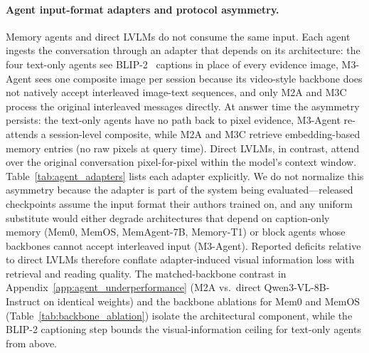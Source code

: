 \documentclass{article}
\begin{document}
\paragraph{Agent input-format adapters and protocol asymmetry.}
Memory agents and direct LVLMs do not consume the same input. Each agent ingests the conversation through an adapter that depends on its architecture: the four text-only agents see BLIP-2~\cite{li2023blip2} captions in place of every evidence image, M3-Agent sees one composite image per session because its video-style backbone does not natively accept interleaved image-text sequences, and only M2A and M3C process the original interleaved messages directly. At answer time the asymmetry persists: the text-only agents have no path back to pixel evidence, M3-Agent re-attends a session-level composite, while M2A and M3C retrieve embedding-based memory entries (no raw pixels at query time). Direct LVLMs, in contrast, attend over the original conversation pixel-for-pixel within the model's context window. Table~\ref{tab:agent_adapters} lists each adapter explicitly. We do not normalize this asymmetry because the adapter is part of the system being evaluated---released checkpoints assume the input format their authors trained on, and any uniform substitute would either degrade architectures that depend on caption-only memory (Mem0, MemOS, MemAgent-7B, Memory-T1) or block agents whose backbones cannot accept interleaved input (M3-Agent). Reported deficits relative to direct LVLMs therefore conflate adapter-induced visual information loss with retrieval and reading quality. The matched-backbone contrast in Appendix~\ref{app:agent_underperformance} (M2A vs.\ direct Qwen3-VL-8B-Instruct on identical weights) and the backbone ablations for Mem0 and MemOS (Table~\ref{tab:backbone_ablation}) isolate the architectural component, while the BLIP-2 captioning step bounds the visual-information ceiling for text-only agents from above.
\end{document}
